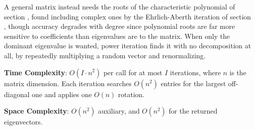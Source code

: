 A general matrix instead needs the roots of the characteristic polynomial of section , found including complex ones by the Ehrlich-Aberth iteration of section , though accuracy degrades with degree since polynomial roots are far more sensitive to coefficients than eigenvalues are to the matrix. When only the dominant eigenvalue is wanted, power iteration finds it with no decomposition at all, by repeatedly multiplying a random vector and renormalizing.

\textbf{Time Complexity}: $O(I \cdot n^{2})$ per call for at most $I$ iterations, where $n$ is the matrix dimension. Each iteration searches $O(n^{2})$ entries for the largest off-diagonal one and applies one $O(n)$ rotation.

\textbf{Space Complexity}: $O(n^{2})$ auxiliary, and $O(n^{2})$ for the returned eigenvectors.

